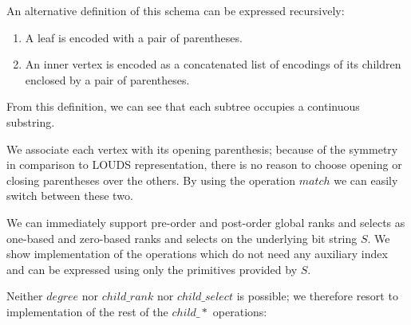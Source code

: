 An alternative definition of this schema can be expressed recursively:
\begin{enumerate}
	\item A leaf is encoded with a pair of parentheses.
	\item An inner vertex is encoded as a concatenated list of encodings of its children enclosed by a pair of parentheses.
\end{enumerate}
From this definition, we can see that each subtree occupies a continuous substring.

\bigskip

We associate each vertex with its opening parenthesis; because of the symmetry in comparison to LOUDS representation, there is no reason to choose opening or closing parentheses over the others.
By using the operation $match$ we can easily switch between these two.

We can immediately support pre-order and post-order global ranks and selects as one-based and zero-based ranks and selects on the underlying bit string $S$.
We show implementation of the operations which do not need any auxiliary index and can be expressed using only the primitives provided by $S$.


\begin{algorithmic}
	\State {}
\EndFunction
\end{algorithmic}

\begin{algorithmic}
	\State {} 
\EndFunction
\end{algorithmic}

\begin{algorithmic}
		\State {}
	\Else
		\State {}
	\EndIf
\EndFunction
\end{algorithmic}

Neither $degree$ nor $child\_rank$ nor $child\_select$ is possible; we therefore resort to implementation of the rest of the $child\_*$ operations:

\begin{algorithmic}
		\State {}
	\Else
		\State {}
	\EndIf
\EndFunction
\end{algorithmic}


